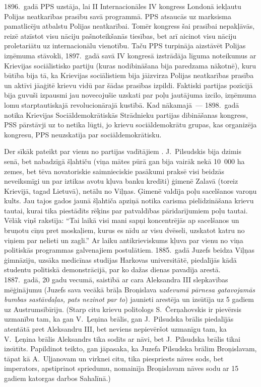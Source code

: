 \documentclass[twoside,a5paper,12pt,fleqn,openany]{extbook}
\begin{document}
1896.~gadā PPS uzstāja, lai II Internacionāles IV kongress Londonā iekļautu Polijas neatkarības prasību savā programmā. PPS atsaucās uz marksisma pamatlicēju atbalstu Polijas neatkarībai. Tomēr kongress šai prasībai nepakļāvās, reizē atzīstot visu nāciju pašnoteikšanās tiesības, bet arī aicinot visu nāciju proletariātu uz internacionālu vienotību. Taču PPS turpināja aizstāvēt Polijas izņēmuma stāvokli, 1897.~gadā savā IV kongresā izstrādāja līguma noteikumus ar Krievijas sociālistisko partiju (kuras nodibināšana bija paredzama nākotnē), kuru būtība bija tā, ka Krievijas sociālistiem bija jāizvirza Polijas neatkarības prasība un aktīvi jāaģitē krievu vidū par šādas prasības izpildi. Faktiski partijas pozīcijā bija guvuši izpausmi jau novecojušie uzskati par poļu jautājuma izcilo, izņēmuma lomu starptautiskajā revolucionārajā kustībā. Kad nākamajā~--- 1898.~gadā notika Krievijas Sociāldemokrātiskās Strādnieku partijas dibināšanas kongress, PSS pārstāvji uz to netika lūgti, jo krievu sociāldemokrātu grupas, kas organizēja kongresu, PPS neuzskatīja par sociāldemokrātisku.

Der sīkāk pateikt par vienu no partijas vadītājiem . J.~Pilsudskis bija dzimis senā, bet nabadzīgā šļahtiču (viņa mātes pūrā gan bija vairāk nekā 10~000 ha zemes, bet tēva novatoriskie saimnieciskie pasākumi praksē visi beidzās neveiksmīgi un par iztikas avotu kļuva banku kredīti) ģimenē Zalavā (toreiz Krievijā, tagad Lietuvā), netālu no Viļņas. Ģimenē valdīja poļu sacelšanos varoņu kults. Jau tajos gados jaunā šļahtiča apziņā notika carisma pielīdzināšana krievu tautai, kurai tika piestādīts rēķins par patvaldības pāridarījumiem poļu tautai. Vēlāk viņš rakstīja: ``Tai laikā visi mani sapņi koncentrējās ap sacelšanos un bruņotu cīņu pret moskaļiem, kurus es nīdu ar visu dvēseli, uzskatot katru no viņiem par nelieti un zagli.'' Ar laiku antikrieviskums kļuva par vienu no viņa politiskās programmas galvenajiem postulātiem. 1885.~gadā Juzefs beidza Viļņas ģimnāziju, uzsāka medicīnas studijas Harkovas universitātē, piedalījās kādā studentu politiskā demonstrācijā, par ko dažas dienas pavadīja arestā. 1887.~gadā, 20 gadu vecumā, saistībā ar cara Aleksandra III slepkavības mēģinājumu (Juzefs sava vecākā brāļa Broņislava \emph{uzdevumā pārnesa gatavojamās bumbas sastāvdaļas, pats nezinot par to}) jaunieti arestēja un izsūtīja uz 5 gadiem uz Austrumsibīriju. (Starp citu krievu politologs S.~Čerņahovskis ir pievērsis uzmanību tam, ka gan V.~Ļeņina brālis, gan J.~Pilsudska brālis piedalījās atentātā pret Aleksandru III, bet neviens nepievēršot uzmanīgu tam, ka V.~Ļeņina brālis Aleksandrs tika sodīts ar nāvi, bet J.~Pilsudska brālis tikai izsūtīts. Papildinot teikto, gan jāpasaka, ka Juzefa Pilsudska brālim Broņislavam, tāpat kā A.~Uļjanovam un virknei citu, tika piespriests nāves sods, bet imperators, apstiprinot spriedumu, nomainīja Broņislavam nāves sodu ar 15 gadiem katorgas darbos Sahalīnā.)
\end{document}

